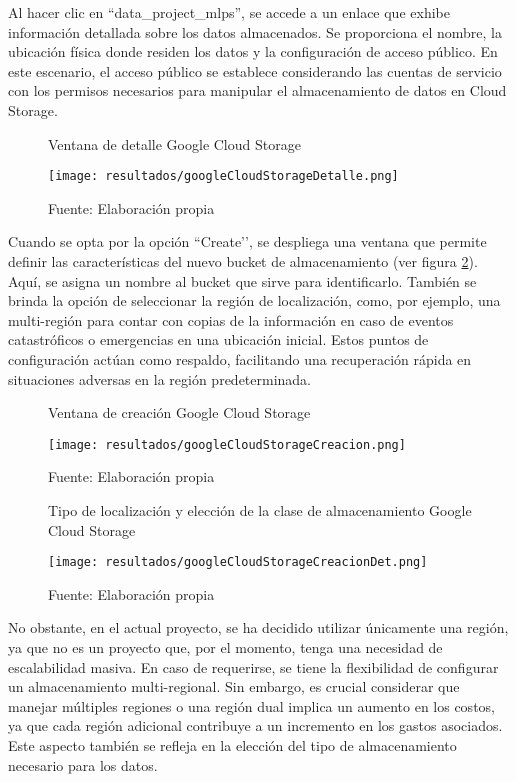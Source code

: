 Al hacer clic en ``data\_project\_mlps'', se accede a un enlace que exhibe información detallada sobre los datos almacenados. Se proporciona el nombre, la ubicación física donde residen los datos y la configuración de acceso público. En este escenario, el acceso público se establece considerando las cuentas de servicio con los permisos necesarios para manipular el almacenamiento de datos en Cloud Storage.

\newpage

\begin{figure}[h]
	\centering
	\caption{Ventana de detalle Google Cloud Storage}
	\texttt{[image: resultados/googleCloudStorageDetalle.png]}
	\caption*{\footnotesize Fuente: Elaboración propia}
	\label{fig:figuraGoogleCloudStorageDetalle}
\end{figure}

Cuando se opta por la opción ``Create’’, se despliega una ventana que permite definir las características del nuevo bucket de almacenamiento (ver figura \ref{fig:figuraGoogleCloudStorageCreacion}). Aquí, se asigna un nombre al bucket que sirve para identificarlo. También se brinda la opción de seleccionar la región de localización, como, por ejemplo, una multi-región para contar con copias de la información en caso de eventos catastróficos o emergencias en una ubicación inicial. Estos puntos de configuración actúan como respaldo, facilitando una recuperación rápida en situaciones adversas en la región predeterminada.

\newpage

\begin{figure}[h]
	\centering
	\caption{Ventana de creación Google Cloud Storage}
	\texttt{[image: resultados/googleCloudStorageCreacion.png]}
	\caption*{\footnotesize Fuente: Elaboración propia}
	\label{fig:figuraGoogleCloudStorageCreacion}
\end{figure}

\begin{figure}[h]
	\centering
	\caption{Tipo de localización y elección de la clase de almacenamiento Google Cloud Storage}
	\texttt{[image: resultados/googleCloudStorageCreacionDet.png]}
	\caption*{\footnotesize Fuente: Elaboración propia}
	\label{fig:figuraGoogleCloudStorageCreacionDet}
\end{figure}


No obstante, en el actual proyecto, se ha decidido utilizar únicamente una región, ya que no es un proyecto que, por el momento, tenga una necesidad de escalabilidad masiva. En caso de requerirse, se tiene la flexibilidad de configurar un almacenamiento multi-regional. Sin embargo, es crucial considerar que manejar múltiples regiones o una región dual implica un aumento en los costos, ya que cada región adicional contribuye a un incremento en los gastos asociados. Este aspecto también se refleja en la elección del tipo de almacenamiento necesario para los datos.

